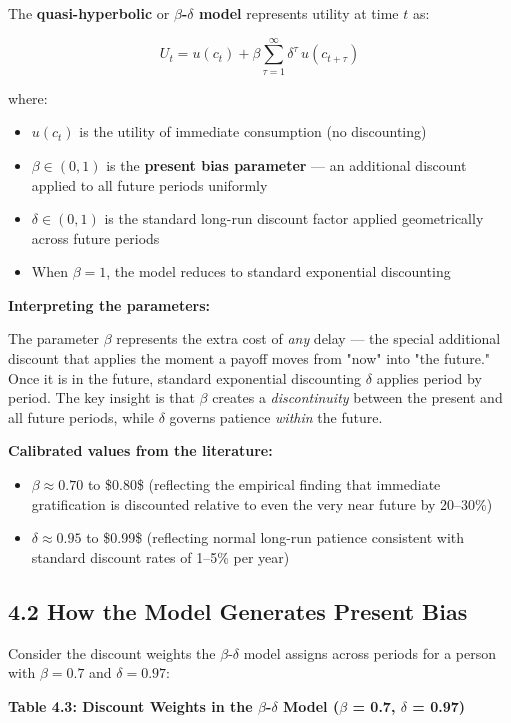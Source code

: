 \documentclass[12pt, letterpaper]{article}
\begin{document}
The \textbf{quasi-hyperbolic} or \textbf{$\beta$-$\delta$ model} represents utility at time $t$ as:

$$U_t = u(c_t) + \beta \sum_{\tau=1}^{\infty} \delta^\tau \, u(c_{t+\tau})$$

where:
\begin{itemize}
\item $u(c_t)$ is the utility of immediate consumption (no discounting)
\item $\beta \in (0,1)$ is the \textbf{present bias parameter} --- an additional discount applied to all future periods uniformly
\item $\delta \in (0,1)$ is the standard long-run discount factor applied geometrically across future periods
\item When $\beta = 1$, the model reduces to standard exponential discounting
\end{itemize}

\textbf{Interpreting the parameters:}

The parameter $\beta$ represents the extra cost of \textit{any} delay --- the special additional discount that applies the moment a payoff moves from "now" into "the future." Once it is in the future, standard exponential discounting $\delta$ applies period by period. The key insight is that $\beta$ creates a \textit{discontinuity} between the present and all future periods, while $\delta$ governs patience \textit{within} the future.

\textbf{Calibrated values from the literature:}
\begin{itemize}
\item $\beta \approx 0.70$ to \$0.80\$ (reflecting the empirical finding that immediate gratification is discounted relative to even the very near future by 20--30\%)
\item $\delta \approx 0.95$ to \$0.99\$ (reflecting normal long-run patience consistent with standard discount rates of 1--5\% per year)
\end{itemize}


\subsection{4.2 How the Model Generates Present Bias}


Consider the discount weights the $\beta$-$\delta$ model assigns across periods for a person with $\beta = 0.7$ and $\delta = 0.97$:

\textbf{Table 4.3: Discount Weights in the $\beta$-$\delta$ Model ($\beta$ = 0.7, $\delta$ = 0.97)}
\end{document}
